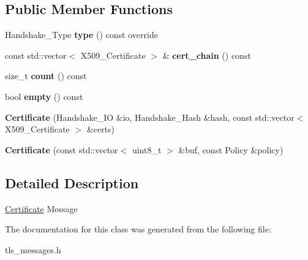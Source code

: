\subsection*{Public Member Functions}
\begin{DoxyCompactItemize}
\item 
\mbox{\label{class_botan_1_1_t_l_s_1_1_certificate_a38a8ef8264fb2a06a4343971beab4a8f}} 
Handshake\+\_\+\+Type {\bfseries type} () const override
\item 
\mbox{\label{class_botan_1_1_t_l_s_1_1_certificate_ab326625098b883d10050fa4cb4d8fd7a}} 
const std\+::vector$<$ X509\+\_\+\+Certificate $>$ \& {\bfseries cert\+\_\+chain} () const
\item 
\mbox{\label{class_botan_1_1_t_l_s_1_1_certificate_ab21ceccfc2c6764d281157d5b1a43047}} 
size\+\_\+t {\bfseries count} () const
\item 
\mbox{\label{class_botan_1_1_t_l_s_1_1_certificate_a2a9116b2a75bb4bc85e285a740e98419}} 
bool {\bfseries empty} () const
\item 
\mbox{\label{class_botan_1_1_t_l_s_1_1_certificate_a115ec120b433f9572103ecf40833b32c}} 
{\bfseries Certificate} (Handshake\+\_\+\+IO \&io, Handshake\+\_\+\+Hash \&hash, const std\+::vector$<$ X509\+\_\+\+Certificate $>$ \&certs)
\item 
\mbox{\label{class_botan_1_1_t_l_s_1_1_certificate_a2000a5fbaabfa453f0fe94daea1af96b}} 
{\bfseries Certificate} (const std\+::vector$<$ uint8\+\_\+t $>$ \&buf, const Policy \&policy)
\end{DoxyCompactItemize}


\subsection{Detailed Description}
\hyperlink{class_botan_1_1_t_l_s_1_1_certificate}{Certificate} Message 

The documentation for this class was generated from the following file\+:\begin{DoxyCompactItemize}
\item 
tls\+\_\+messages.\+h\end{DoxyCompactItemize}
